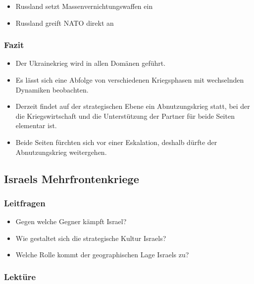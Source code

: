 {}\documentclass[a4paper]{article}
\providecommand{\tightlist}{\setlength{\itemsep}{1mm}\setlength{\parskip}{1mm}}
\begin{document}
\begin{itemize}
	\tightlist
	\item
	      Russland setzt Massenvernichtungswaffen ein
	\item
	      Russland greift NATO direkt an
\end{itemize}

\subsubsection{Fazit}\label{fazit-5}

\begin{itemize}
	\tightlist
	\item
	      Der Ukrainekrieg wird in allen Domänen geführt.
	\item
	      Es lässt sich eine Abfolge von verschiedenen Kriegsphasen mit
	      wechselnden Dynamiken beobachten.
	\item
	      Derzeit findet auf der strategischen Ebene ein Abnutzungskrieg statt,
	      bei der die Kriegswirtschaft und die Unterstützung der Partner für
	      beide Seiten elementar ist.
	\item
	      Beide Seiten fürchten sich vor einer Eskalation, deshalb dürfte der
	      Abnutzungskrieg weitergehen.
\end{itemize}

\subsection{Israels Mehrfrontenkriege}\label{israels-mehrfrontenkriege}

\subsubsection{Leitfragen}\label{leitfragen-10}

\begin{itemize}
	\tightlist
	\item
	      Gegen welche Gegner kämpft Israel?
	\item
	      Wie gestaltet sich die strategische Kultur Israels?
	\item
	      Welche Rolle kommt der geographischen Lage Israels zu?
\end{itemize}

\subsubsection{Lektüre}\label{lektuxfcre-10}
\end{document}
